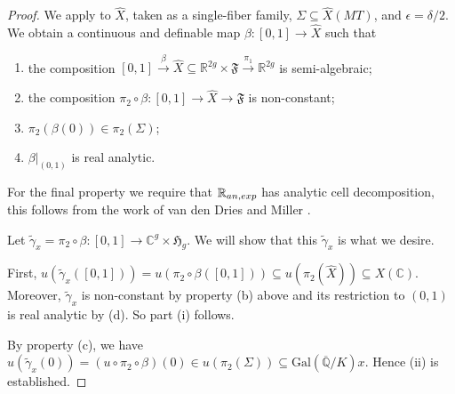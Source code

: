 \documentclass[12pt,oneside]{amsart}
\numberwithin{maincounter}{section}
\numberwithin{equation}{section}
\def\RR{\mathbb{R}}
\def\CC{\mathbb{C}}
\def\QQ{\mathbb{Q}}
\newcommand{\IC}{{\CC}}
\newcommand{\IR}{{\RR}}
\newcommand{\IRanexp}{{{\RR}_{\rm an,exp}}}
\newcommand{\IQbar}{{\overline{\QQ}}}
\renewcommand{\subset}{\subseteq} %
\newcommand{\philipp}[1]{{\color{blue} Philipp: #1}}
\begin{document}
\begin{proof}


We apply \cite[Cor.7.2]{HabeggerPilaENS} to $\hat X$, taken as a
single-fiber family, $\Sigma \subseteq \hat{X}(MT)$, and $\epsilon =
\delta/2$. We obtain a continuous and definable map $\beta \colon
[0,1] \rightarrow \hat{X}$ such that
\begin{enumerate}
\item[(a)] the composition $[0,1]\xrightarrow{\beta} \hat{X} \subseteq \IR^{2g} \times \mathfrak{F} \xrightarrow{\pi_1} \IR^{2g}$ is semi-algebraic;
\item[(b)] the composition $\pi_2 \circ \beta \colon [0,1]\rightarrow \hat{X} \rightarrow \mathfrak{F}$ is non-constant;
\item[(c)] $\pi_2(\beta(0)) \in \pi_2(\Sigma)$;
\item[(d)] $\beta|_{(0,1)}$ is real analytic. 
\end{enumerate}
For the final property we require that $\IRanexp$ has analytic
cell decomposition, this follows from the
work of van den Dries and Miller \cite{DriesMiller:94}. %

Let $\tilde\gamma_x = \pi_2\circ\beta\colon [0,1]\rightarrow
\IC^g\times \mathfrak{H}_g$. 
We will show that this $\tilde\gamma_x$ is what
we desire.



First, $u(\tilde\gamma_x([0,1])) = u(\pi_2\circ \beta([0,1])) \subseteq
u(\pi_2(\hat{X}))\subset X(\IC)$. 
 Moreover, $\tilde\gamma_x$ is non-constant by property (b) above
and its restriction to $(0,1)$ is real analytic by (d). So part (i) follows.

By property (c), we have $u(\tilde\gamma_x(0)) = (u\circ \pi_2\circ\beta)(0) \in u(\pi_2(\Sigma)) \subseteq \mathrm{Gal}(\IQbar/K)x$. Hence (ii) is established.


\end{proof}
\end{document}
